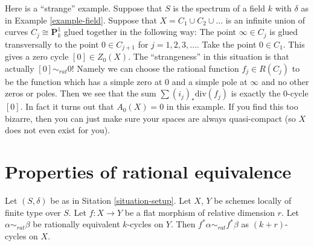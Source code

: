 \begin{example}
\label{example-weird}
Here is a ``strange'' example.
Suppose that $S$ is the spectrum of a field $k$
with $\delta$ as in Example \ref{example-field}.
Suppose that $X = C_1 \cup C_2 \cup \ldots$ is an infinite
union of curves $C_j \cong \mathbf{P}^1_k$ glued together
in the following way: The point $\infty \in C_j$ is glued
transversally to the point $0 \in C_{j + 1}$ for $j = 1, 2, 3, \ldots$.
Take the point $0 \in C_1$. This gives a zero cycle
$[0] \in Z_0(X)$. The ``strangeness'' in this situation is
that actually $[0] \sim_{rat} 0$! Namely we can choose
the rational function $f_j \in R(C_j)$ to be the function
which has a simple zero at $0$ and a simple pole at $\infty$
and no other zeros or poles. Then we see that the sum
$\sum (i_j)_*\text{div}(f_j)$ is exactly the $0$-cycle
$[0]$. In fact it turns out that $A_0(X) = 0$ in this example.
If you find this too bizarre, then you can just
make sure your spaces are always quasi-compact
(so $X$ does not even exist for you).
\end{example}









\section{Properties of rational equivalence}
\label{section-properties-rational-equivalence}

\begin{lemma}
\label{lemma-flat-pullback-rational-equivalence}
Let $(S, \delta)$ be as in Sitation \ref{situation-setup}.
Let $X$, $Y$ be schemes locally of finite type over $S$.
Let $f : X \to Y$ be a flat morphism of relative dimension $r$.
Let $\alpha \sim_{rat} \beta$ be rationally equivalent $k$-cycles on $Y$.
Then $f^*\alpha \sim_{rat} f^*\beta$ as $(k + r)$-cycles on $X$.
\end{lemma}

